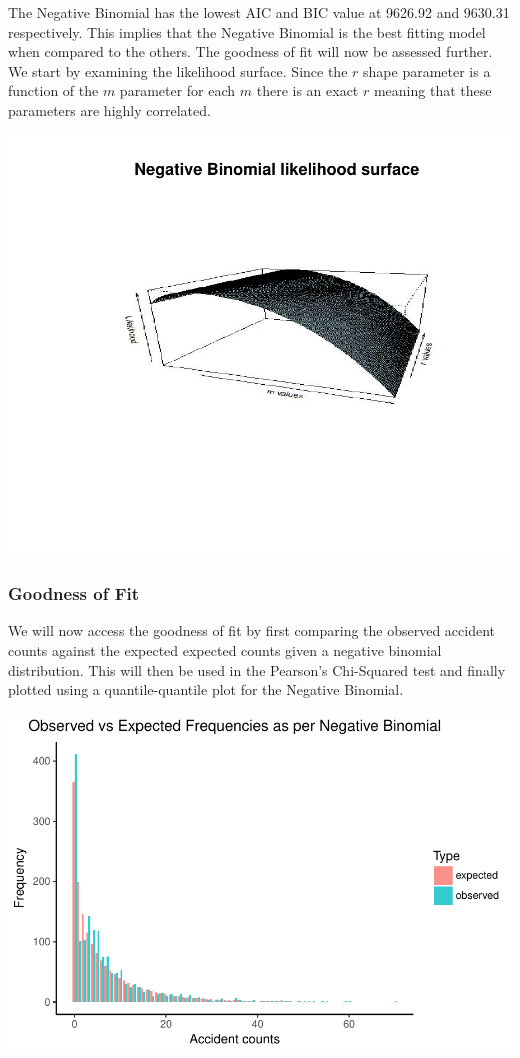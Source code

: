 \documentclass[11pt,preprint, authoryear]{elsarticle}
\numberwithin{equation}{section}
\numberwithin{figure}{section}
\numberwithin{table}{section}
\begin{document}
The Negative Binomial has the lowest AIC and BIC value at 9626.92 and
9630.31 respectively. This implies that the Negative Binomial is the
best fitting model when compared to the others. The goodness of fit will
now be assessed further. We start by examining the likelihood surface.
Since the \(r\) shape parameter is a function of the \(m\) parameter for
each \(m\) there is an exact \(r\) meaning that these parameters are
highly correlated.

\includegraphics{likelihood_files/figure-latex/NegBin Likelihood vis-1.pdf}

\subsubsection{Goodness of Fit}\label{goodness-of-fit}

We will now access the goodness of fit by first comparing the observed
accident counts against the expected expected counts given a negative
binomial distribution. This will then be used in the Pearson's
Chi-Squared test and finally plotted using a quantile-quantile plot for
the Negative Binomial.

\includegraphics{likelihood_files/figure-latex/best_model_fit-1.pdf}
\end{document}
